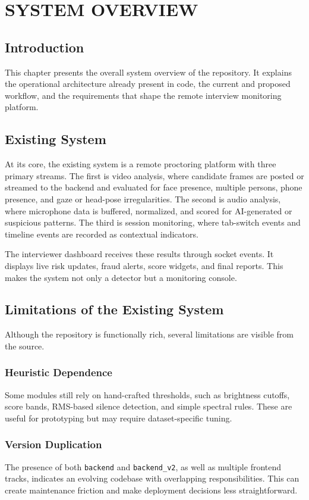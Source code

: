 \documentclass[12pt,a4paper]{extreport}
\begin{document}
\chapter{SYSTEM OVERVIEW}
\section{Introduction}
This chapter presents the overall system overview of the repository. It explains the operational architecture already present in code, the current and proposed workflow, and the requirements that shape the remote interview monitoring platform.

\section{Existing System}
At its core, the existing system is a remote proctoring platform with three primary streams. The first is video analysis, where candidate frames are posted or streamed to the backend and evaluated for face presence, multiple persons, phone presence, and gaze or head-pose irregularities. The second is audio analysis, where microphone data is buffered, normalized, and scored for AI-generated or suspicious patterns. The third is session monitoring, where tab-switch events and timeline events are recorded as contextual indicators.

The interviewer dashboard receives these results through socket events. It displays live risk updates, fraud alerts, score widgets, and final reports. This makes the system not only a detector but a monitoring console.

\section{Limitations of the Existing System}
Although the repository is functionally rich, several limitations are visible from the source.

\subsection{Heuristic Dependence}
Some modules still rely on hand-crafted thresholds, such as brightness cutoffs, score bands, RMS-based silence detection, and simple spectral rules. These are useful for prototyping but may require dataset-specific tuning.

\subsection{Version Duplication}
The presence of both \texttt{backend} and \texttt{backend\_v2}, as well as multiple frontend tracks, indicates an evolving codebase with overlapping responsibilities. This can create maintenance friction and make deployment decisions less straightforward.
\end{document}
